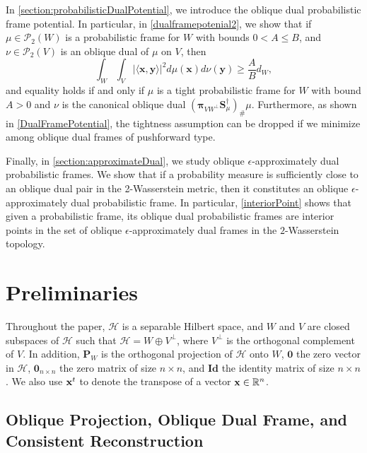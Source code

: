 \documentclass{amsart}
\numberwithin{equation}{section}
\newcommand{\bP}{{\mathbf P}}
\newcommand{\bpi}{{\boldsymbol{\pi}}}
\theoremstyle{plain}
\theoremstyle{remark}
\theoremstyle{definition}
\begin{document}
In \cref{section:probabilisticDualPotential}, we introduce the oblique dual probabilistic frame potential. In particular, in \cref{dualframepotenial2}, we show that if $\mu \in \mathcal{P}_2(W)$ is a probabilistic frame for $W$ with bounds $0<A \leq B$, and  $\nu \in \mathcal{P}_2(V)$ is an oblique dual of $\mu$ on $V$, then
\begin{equation*}
     \int_{W}  \int_{V} |\langle \mathbf{x}, \mathbf{y} \rangle |^2 d\mu(\mathbf{x}) d\nu(\mathbf{y}) \geq \frac{A}{B}d_W,
\end{equation*}
and equality holds if and only if $\mu$ is a tight probabilistic frame for $W$ with bound $A>0$ and $\nu $ is the canonical oblique dual $ ({\bpi_{VW^\perp}\mathbf{S}^{\dagger}_\mu})_\# \mu$. Furthermore, as shown in \cref{DualFramePotential}, the tightness assumption can be dropped if we minimize among oblique dual frames of pushforward type.




Finally, in \cref{section:approximateDual}, we study oblique $\epsilon$-approximately dual probabilistic frames. We show that if a probability measure is sufficiently close to an oblique dual pair in the 2-Wasserstein metric, then it constitutes an oblique $\epsilon$-approximately dual probabilistic frame. In particular, \cref{interiorPoint} shows that given a probabilistic frame, its oblique dual probabilistic frames are interior points in the set of oblique $\epsilon$-approximately dual frames in the $2$-Wasserstein topology. 


\section{Preliminaries}\label{section:preliminaries}
Throughout the paper, $\mathcal{H}$ is a separable Hilbert space, and $W$ and $V$ are closed subspaces of $\mathcal{H}$ such that $\mathcal{H} = W \oplus V^\perp$, where $V^\perp$ is the orthogonal complement of $V$. In addition, 
$\bP_W$ is the orthogonal projection of $\mathcal{H}$ onto $W$, $\mathbf{0}$ the zero vector in $\mathcal{H}$, $\mathbf{0}_{n \times n}$ the zero matrix of size $n \times n$, and $\mathbf{Id}$ the identity matrix of size $n \times n$. We also use ${\bf x}^t$ to denote the transpose of a vector ${\bf x} \in \mathbb{R}^n$. 

\subsection{Oblique Projection, Oblique Dual Frame, and Consistent Reconstruction}
\end{document}
